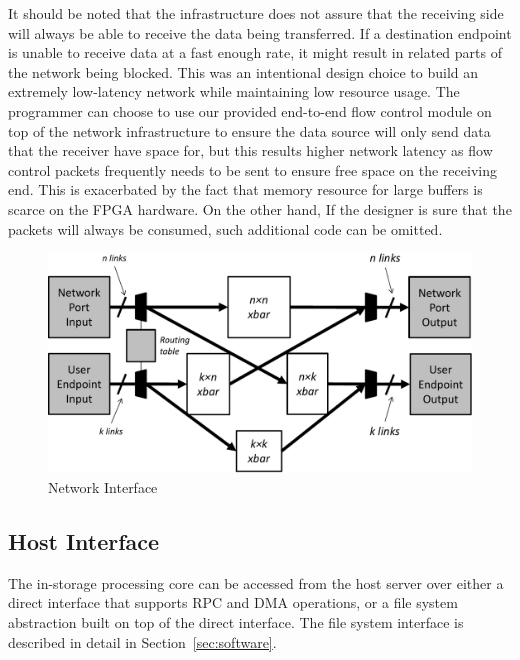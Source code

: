 It should be noted that the infrastructure does not assure that the receiving
side will always be able to receive the data being transferred. If a
destination endpoint is unable to receive data at a fast enough rate, it might
result in related parts of the network being blocked. This was an intentional
design choice to build an extremely low-latency network while maintaining low
resource usage. The programmer can choose to use our provided end-to-end flow
control module on top of the network infrastructure to ensure the data source
will only send data that the receiver have space for, but this results higher
network latency as flow control packets frequently needs to be sent to ensure
free space on the receiving end. This is exacerbated by the fact that memory
resource for large buffers is scarce on the FPGA hardware. On the other hand,
If the designer is sure that the packets will
always be consumed, such additional code can be omitted. 

\begin{figure}[h]
	\begin{center}
	\includegraphics[scale=0.4]{figures/network-routing-crop.pdf}
	\caption{Network Interface}
	\label{fig:networkinterface}
	\end{center}
\end{figure}


\subsection{Host Interface}

The in-storage processing core can be accessed from the host server over either
a direct interface that supports RPC and DMA operations, or a file system
abstraction built on top of the direct interface. The file system interface is
described in detail in Section~\ref{sec:software}.

